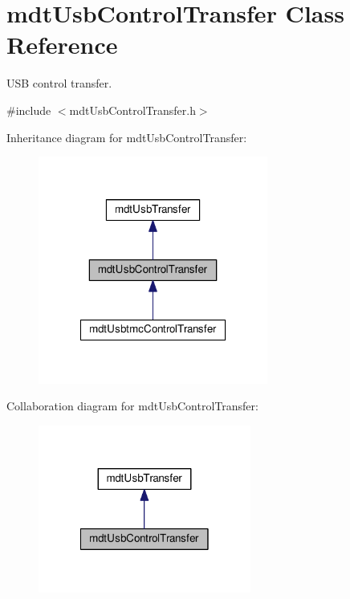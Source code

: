 \hypertarget{classmdt_usb_control_transfer}{\section{mdt\-Usb\-Control\-Transfer Class Reference}
\label{classmdt_usb_control_transfer}
}


U\-S\-B control transfer.  




{\ttfamily \#include $<$mdt\-Usb\-Control\-Transfer.\-h$>$}



Inheritance diagram for mdt\-Usb\-Control\-Transfer\-:
\nopagebreak
\begin{figure}[H]
\begin{center}
\leavevmode
\includegraphics[width=214pt]{classmdt_usb_control_transfer__inherit__graph}
\end{center}
\end{figure}


Collaboration diagram for mdt\-Usb\-Control\-Transfer\-:
\nopagebreak
\begin{figure}[H]
\begin{center}
\leavevmode
\includegraphics[width=198pt]{classmdt_usb_control_transfer__coll__graph}
\end{center}
\end{figure}
